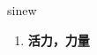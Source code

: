 
\begin{frame}
{\huge sinew}
\begin{center}
\begin{enumerate}\Large
  \item \textbf{活力，力量}
\end{enumerate}
\end{center}
\end{frame}
